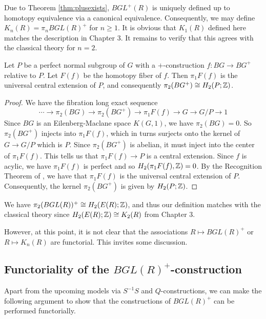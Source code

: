Due to Theorem \ref{thm:plusexists}, $BGL^+(R)$ is uniquely defined up to homotopy equivalence via a canonical equivalence.
Consequently, we may define $K_n(R) = \pi_n BGL(R)^+$ for $n \geq 1$.
It is obvious that $K_1(R)$ defined here matches the description in Chapter 3.
It remains to verify that this agrees with the classical theory for $n = 2$.

\begin{proposition}
Let $P$ be a perfect normal subgroup of $G$ with a $+$-construction $f : BG \to BG^+$ relative to $P$.
Let $F(f)$ be the homotopy fiber of $f$. Then $\pi_1F(f)$ is the universal central extension of $P$, and consequently $\pi_2 (BG^+) \cong H_2(P;\mathbb{Z})$.
\end{proposition}
\begin{proof}
We have the fibration long exact sequence
\[
  \cdots \to \pi_2(BG) \to \pi_2(BG^+) \to \pi_1 F(f) \to G \to G/P \to 1
\]
Since $BG$ is an Eilenberg-Maclane space $K(G,1)$, we have $\pi_2(BG) = 0$.
So $\pi_2(BG^+)$ injects into $\pi_1F(f)$, which in turns surjects onto the kernel of $G \to G/P$ which is $P$.
Since $\pi_2(BG^+)$ is abelian, it must inject into the center of $\pi_1 F(f)$.
This tells us that $\pi_1F(f) \to P$ is a central extension.
Since $f$ is acylic, we have $\pi_1 F(f)$ is perfect and so $H_2(\pi_1 F(f), \mathbb{Z}) = 0$.
By the Recognition Theorem of \label{thm:recog_universalcentral}, we have that $\pi_1F(f)$ is the universal central extension of $P$.
Consequently, the kernel $\pi_2(BG^+)$ is given by $H_2(P;\mathbb{Z})$.

\end{proof}

\begin{corollary}
We have $\pi_2(BGL(R))^+ \cong H_2(E(R);\mathbb{Z})$, and thus our definition matches with the classical theory
since $H_2(E(R);\mathbb{Z}) \cong K_2(R)$ from Chapter 3.
\end{corollary}

However, at this point, it is not clear that the associations $R \mapsto BGL(R)^+$ or $R \mapsto K_n(R)$ are functorial.
This invites some discussion.

\subsection{Functoriality of the $BGL(R)^+$-construction}
Apart from the upcoming models via $S^{-1}S$ and $Q$-constructions, we can make the following argument to show that
the constructions of $BGL(R)^+$ can be performed functorially.

